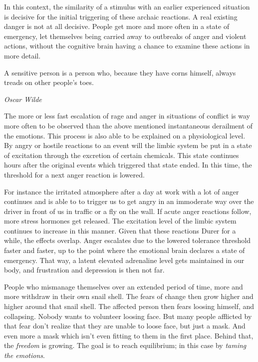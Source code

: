 \documentclass[../Book.Stress_regulation.tex]{subfiles}
\begin{document}
In this context, the similarity of a stimulus with an earlier experienced situation is decisive for the initial triggering of these archaic reactions.
A real existing danger is not at all decisive.
People get more and more often in a state of emergency, let themselves being carried away to outbreaks of anger and violent actions,
without the cognitive brain having a chance to examine these actions in more detail.

\epigraph{A sensitive person is a person who, because they have corns himself, always treads on other people's toes.}{\textit{Oscar Wilde}}

The more or less fast escalation of rage and anger in situations of conflict is way more often to be observed  than the above mentioned instantaneous derailment of the emotions.
This process is also able to be explained on a physiological level.
By angry or hostile reactions to an event will the limbic system be put in a state of excitation through the excretion of certain chemicals.
This state continues hours after the original events which triggered that state ended.
In this time, the threshold for a next anger reaction is lowered.

For instance the irritated atmosphere after a day at work with a lot of anger continues and is able to to trigger us to get angry in an immoderate way
over the driver in front of us in traffic or a fly on the wall.
If acute anger reactions follow, more stress hormones get released.
The excitation level of the limbic system continues to increase in this manner.
Given that these reactions Durer for a while, the effects overlap.
Anger escalates due to the lowered tolerance threshold faster and faster, up to the point where the emotional brain declares a state of emergency.
That way, a latent elevated adrenaline level gets maintained in our body, and frustration and depression is then not far.

People who mismanage themselves over an extended period of time, more and more withdraw in their own snail shell.
The fears of change then grow higher and higher around that snail shell.
The affected person then fears loosing himself, and collapsing.
Nobody wants to volunteer loosing face.
But many people afflicted by that fear don't realize that they are unable to loose face, but just a mask.
And even more a mask which isn't even fitting to them in the first place.
Behind that, the \emph{freedom} is growing.
The goal is to reach equilibrium; in this case by \emph{taming the emotions}.
\end{document}
